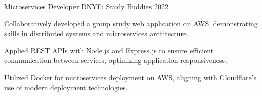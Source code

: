 \begin{cventries}
        \cventry
          {Microservices Developer} %
          {DNYF: Study Buddies} %
          {} %
          {2022} %
          {
            \begin{cvitems} %
            \item {Collaboratively developed a group study web application on AWS, demonstrating skills in distributed systems and microservices architecture.}
    \item {Applied REST APIs with Node.js and Express.js to ensure efficient communication between services, optimizing application responsiveness.}
    \item {Utilized Docker for microservices deployment on AWS, aligning with Cloudflare's use of modern deployment technologies.}
            \end{cvitems}
          }
\end{cventries}

